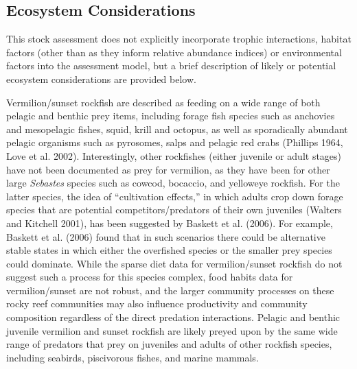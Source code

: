 \documentclass[
  english,
  a4paper,
]{article}
\begin{document}
\hypertarget{ecosystem-considerations}{%
\subsection{Ecosystem Considerations}\label{ecosystem-considerations}}

This stock assessment does not explicitly incorporate trophic interactions,
habitat factors (other than as they inform relative abundance indices) or environmental
factors into the assessment model, but a brief description of likely or potential
ecosystem considerations are provided below.

Vermilion/sunset rockfish are described as feeding on a wide range of both
pelagic and benthic prey items, including forage fish species such as anchovies
and mesopelagic fishes, squid, krill and octopus, as well as sporadically abundant
pelagic organisms such as pyrosomes, salps and pelagic red crabs
(Phillips 1964, Love et al. 2002). Interestingly, other rockfishes (either juvenile or
adult stages) have not been
documented as prey for vermilion, as they have been for other large \emph{Sebastes}
species such as cowcod, bocaccio, and yelloweye rockfish. For the latter species,
the idea of ``cultivation effects,'' in which adults crop down forage species that
are potential competitors/predators of their own juveniles (Walters and Kitchell 2001),
has been suggested by Baskett et al. (2006). For example, Baskett et al. (2006)
found that in such scenarios there could be alternative stable states in which
either the overfished species or the smaller prey species could dominate. While
the sparse diet data for vermilion/sunset rockfish do not suggest such a process
for this species complex, food habits data for vermilion/sunset are not robust,
and the larger community processes on these rocky reef communities may also influence
productivity and community composition regardless of the direct predation interactions.
Pelagic and benthic juvenile vermilion and sunset rockfish are likely preyed upon by
the same wide range of predators that prey on juveniles and adults of other rockfish
species, including seabirds, piscivorous fishes, and marine mammals.
\end{document}
